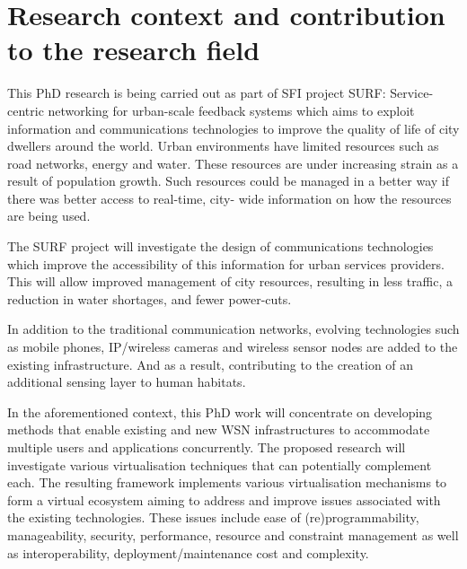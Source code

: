 \documentclass[11pt]{article}
\begin{document}


%

\pagebreak
\section{Research context and contribution to the research field}

This PhD research is being carried out as part of SFI project SURF: Service-centric networking for urban-scale feedback systems which aims to exploit information
and communications technologies to improve the quality of life of city dwellers around
the world. Urban environments have limited resources such as road networks, energy and
water. These resources are under increasing strain as a result of population growth. Such
resources could be managed in a better way if there was better access to real-time, city-
wide information on how the resources are being used.

The SURF project will investigate the design of communications technologies which improve the accessibility of this information for urban services providers. This will allow improved management of city resources, resulting in less traffic, a reduction in water shortages, and fewer power-cuts.

In addition to the traditional communication networks, evolving technologies such as mobile phones, IP/wireless cameras and wireless sensor nodes are added to the existing infrastructure. And as a result, contributing to the creation of an additional sensing layer to human habitats.

In the aforementioned context, this PhD work will concentrate on developing methods that enable existing and new WSN infrastructures to accommodate multiple users and applications concurrently. The proposed research will investigate various virtualisation techniques that can potentially complement each. The resulting framework implements various virtualisation mechanisms to form a virtual ecosystem aiming to address and improve issues associated with the existing technologies. These issues include ease of (re)programmability,  manageability, security, performance, resource and constraint management as well as interoperability, deployment/maintenance cost and complexity.


%
\pagebreak
\end{document}
